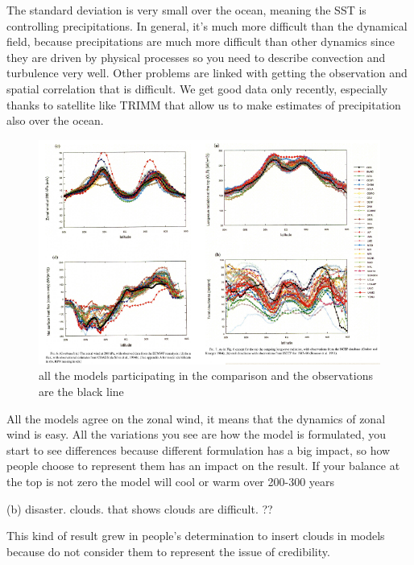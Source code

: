 The standard deviation is very small over the ocean, meaning the SST is controlling precipitations. 
In general, it's much more difficult than the dynamical field, because precipitations are much more difficult than other dynamics since they are driven by physical processes so you need to describe convection and turbulence very well. Other problems are linked with getting the observation and spatial correlation that is difficult. We get good data only recently, especially thanks to satellite like TRIMM that allow us to make estimates of precipitation also over the ocean. 


\begin{figure}
    \centering
    \includegraphics[width=0.5\linewidth]{uploads/Screenshot 2024-11-20 210633.png}
    \caption{all the models participating in the comparison and the observations are the black line}
    \label{fig:enter-label}
\end{figure}
All the models agree on the zonal wind, it means that the dynamics of zonal wind is easy. All the variations you see are how the model is formulated, you start to see differences because different formulation has a big impact, so how people choose to represent them has an impact on the result. 
If your balance at the top is not zero the model will cool or warm over 200-300 years 

(b) disaster. clouds. that shows clouds are difficult. ??


This kind of result grew in people's determination to insert clouds in models because do not consider them to represent the issue of credibility. 




